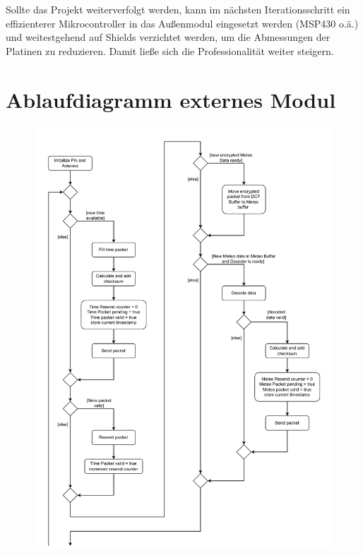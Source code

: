 \documentclass[a4paper,11pt]{article}
\begin{document}
\vspace{0.2cm}
\noindent
Sollte das Projekt weiterverfolgt werden, kann im nächsten Iterationsschritt ein effizienterer Mikrocontroller in das Außenmodul eingesetzt werden (MSP430 o.ä.)
und weitestgehend auf Shields verzichtet werden, um die Abmessungen der Platinen zu reduzieren. Damit ließe sich die Professionalität weiter steigern. 

\newpage
\appendix

\section{Ablaufdiagramm externes Modul}
\label{subapp:ablaufExt}

\begin{figure}[H]
  \centering
  \includegraphics[scale=0.75, page=1]{Ablauf extern.pdf}
\end{figure}
\end{document}
